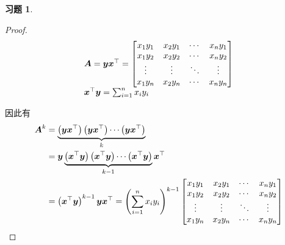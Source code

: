 \documentclass{ctexart}
\newtheorem{problem}{习题}[section]
\begin{document}
\begin{problem}
\end{problem}
\begin{proof}
    \begin{equation*}
        \begin{array}{lll}
            \boldsymbol{A}=\boldsymbol{y}\boldsymbol{x}^\top=
            \begin{bmatrix}
                x_1y_1 & x_2y_1 & \cdots & x_ny_1 \\
                x_1y_2 & x_2y_2 & \cdots & x_ny_2 \\
                \vdots & \vdots & \ddots & \vdots \\
                x_1y_n & x_2y_n & \cdots & x_ny_n \\
            \end{bmatrix}         \\
            \boldsymbol{x}^\top\boldsymbol{y}=\sum_{i=1}^nx_iy_i \\
        \end{array}
    \end{equation*}

    因此有
    \begin{align*}
        \boldsymbol{A}^k & =\underbrace{\left( \boldsymbol{y}\boldsymbol{x}^\top \right)\left( \boldsymbol{y}\boldsymbol{x}^\top \right)\cdots\left( \boldsymbol{y}\boldsymbol{x}^\top \right)}_k                    \\
                & =\boldsymbol{y}\underbrace{\left( \boldsymbol{x}^\top\boldsymbol{y} \right)\left( \boldsymbol{x}^\top\boldsymbol{y} \right)\cdots\left( \boldsymbol{x}^\top\boldsymbol{y} \right)}_{k-1}\boldsymbol{x}^\top \\
                & =\left( \boldsymbol{x}^\top\boldsymbol{y} \right)^{k-1}\boldsymbol{y}\boldsymbol{x}^\top=\left( \sum_{i=1}^nx_iy_i \right)^{k-1}
        \begin{bmatrix}
            x_1y_1 & x_2y_1 & \cdots & x_ny_1 \\
            x_1y_2 & x_2y_2 & \cdots & x_ny_2 \\
            \vdots & \vdots & \ddots & \vdots \\
            x_1y_n & x_2y_n & \cdots & x_ny_n \\
        \end{bmatrix}
    \end{align*}
\end{proof}
\end{document}

